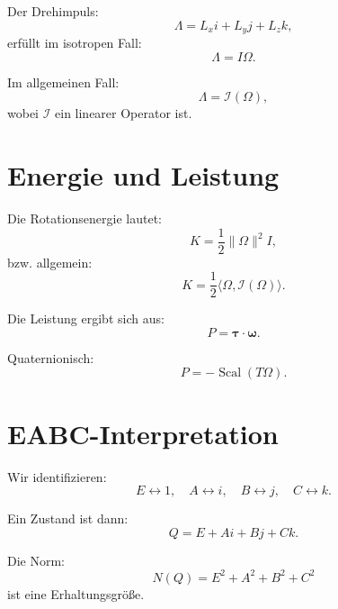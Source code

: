 \documentclass[11pt]{article}
\begin{document}
	Der Drehimpuls:
	\begin{equation}
		\Lambda = L_x i + L_y j + L_z k,
	\end{equation}
	erfüllt im isotropen Fall:
	\begin{equation}
		\Lambda = I \Omega.
	\end{equation}
	
	Im allgemeinen Fall:
	\begin{equation}
		\Lambda = \mathcal I(\Omega),
	\end{equation}
	wobei $\mathcal I$ ein linearer Operator ist.
	
	\section{Energie und Leistung}
	
	Die Rotationsenergie lautet:
	\begin{equation}
		K = \frac12 \|\Omega\|^2 I,
	\end{equation}
	bzw. allgemein:
	\begin{equation}
		K = \frac12 \langle \Omega, \mathcal I(\Omega) \rangle.
	\end{equation}
	
	Die Leistung ergibt sich aus:
	\begin{equation}
		P = \boldsymbol\tau \cdot \boldsymbol\omega.
	\end{equation}
	
	Quaternionisch:
	\begin{equation}
		P = -\operatorname{Scal}(T\Omega).
	\end{equation}
	
	\section{EABC-Interpretation}
	
	Wir identifizieren:
	\begin{equation}
		E \leftrightarrow 1,\quad
		A \leftrightarrow i,\quad
		B \leftrightarrow j,\quad
		C \leftrightarrow k.
	\end{equation}
	
	Ein Zustand ist dann:
	\begin{equation}
		Q = E + Ai + Bj + Ck.
	\end{equation}
	
	Die Norm:
	\begin{equation}
		N(Q) = E^2 + A^2 + B^2 + C^2
	\end{equation}
	ist eine Erhaltungsgröße.
	
\end{document}
